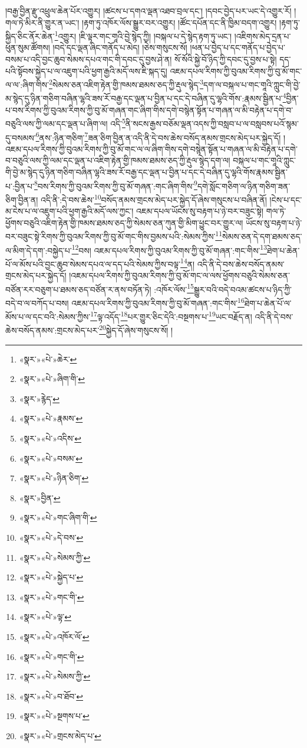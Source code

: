 །བརྒྱ་བྱིན་རྫུ་འཕྲུལ་ཆེན་པོར་འགྱུར། །ཚངས་པ་དགའ་ལྡན་འཐབ་བྲལ་དང་། །དབང་བྱེད་པར་ཡང་དེ་འགྱུར་རོ། །གལ་ཏེ་མིར་ནི་གྱུར་ན་ཡང་། །རྟག་ཏུ་འཁོར་ལོས་སྒྱུར་བར་འགྱུར། །ཚོང་དཔོན་དང་ནི་ཁྱིམ་བདག་འགྱུར། །རྟག་ཏུ་སྐྱིད་ཅིང་ནོར་ཆེན་\footnote{«སྣར་»«པེ་»ཆེར་}འགྱུར། །ཇི་ལྟར་གང་གཱའི་བྱེ་སྙེད་ཀྱི། །བསྐལ་པ་དེ་སྙེད་རྟག་ཏུ་ཡང་། །འཇིགས་མེད་དྲན་པ་ཕུན་སུམ་ཚོགས། །བདེ་དང་ལྡན་ཞིང་གནོད་པ་མེད། །ཅེས་གསུངས་སོ། །ཕན་པ་བྱེད་པ་དང་གནོད་པ་བྱེད་པ་བསམ་པ་འདི་བྱང་ཆུབ་སེམས་དཔའ་གང་གི་དབང་དུ་བྱས་ཤེ་ན། སོ་སོའི་སྐྱེ་བོ་ཉིད་ཀྱི་དབང་དུ་བྱས་པ་སྟེ། དད་པའི་སྟོབས་སྐྱེད་པ་ལ་འཇུག་པའི་ཕྱག་རྒྱའི་མདོ་ལས་ཇི་སྐད་དུ། འཇམ་དཔལ་རིགས་ཀྱི་བུའམ་རིགས་ཀྱི་བུ་མོ་གང་ལ་ལ་:ཞིག་གིས་\footnote{«སྣར་»«པེ་»ཞིག་གི་}སེམས་ཅན་འཇིག་རྟེན་གྱི་ཁམས་ཐམས་ཅད་ཀྱི་རྡུལ་སྙེད་\footnote{«སྣར་»རྙེད་}དག་ལ་བསྐལ་པ་གང་གཱའི་ཀླུང་གི་བྱེ་མ་སྙེད་དུ་ཉིན་གཅིག་བཞིན་ལྷའི་ཟས་རོ་བརྒྱ་དང་ལྡན་པ་བྱིན་པ་དང་དེ་བཞིན་དུ་ལྷའི་གོས་:རྣམས་སྦྱིན་པ་\footnote{«སྣར་»«པེ་»རྣམས་}བྱིན་པ་བས་རིགས་ཀྱི་བུའམ་རིགས་ཀྱི་བུ་མོ་གཞན་གང་ཞིག་གིས་དགེ་བསྙེན་སྟོན་པ་གཞན་ལ་མི་བརྟེན་པ་དགེ་བ་བཅུའི་ལས་ཀྱི་ལམ་དང་ལྡན་པ་ཞིག་ལ། འདི་\footnote{«སྣར་»«པེ་»འདིས་}ནི་སངས་རྒྱས་བཅོམ་ལྡན་འདས་ཀྱི་བསླབ་པ་ལ་བསླབས་པའོ་སྙམ་དུ་བསམས་\footnote{«སྣར་»«པེ་»བསམ་}ནས་:ཉིན་གཅིག་\footnote{«སྣར་»«པེ་»ཉིན་ཅིག་}ཟན་ཅིག་བྱིན་ན་འདི་ནི་དེ་བས་ཆེས་བསོད་ནམས་གྲངས་མེད་པར་སྐྱེད་དོ། །འཇམ་དཔལ་རིགས་ཀྱི་བུའམ་རིགས་ཀྱི་བུ་མོ་གང་ལ་ལ་ཞིག་གིས་དགེ་བསྙེན་སྟོན་པ་གཞན་ལ་མི་བརྟེན་པ་དགེ་བ་བཅུའི་ལས་ཀྱི་ལམ་དང་ལྡན་པ་འཇིག་རྟེན་གྱི་ཁམས་ཐམས་ཅད་ཀྱི་རྡུལ་སྙེད་དག་ལ། བསྐལ་པ་གང་གཱའི་ཀླུང་གི་བྱེ་མ་སྙེད་དུ་ཉིན་གཅིག་བཞིན་ལྷའི་ཟས་རོ་བརྒྱ་དང་ལྡན་པ་བྱིན་པ་དང་དེ་བཞིན་དུ་ལྷའི་གོས་རྣམས་སྦྱིན་པ་:བྱིན་པ་\footnote{«སྣར་»བྱིན་}བས་རིགས་ཀྱི་བུའམ་རིགས་ཀྱི་བུ་མོ་གཞན་:གང་ཞིག་གིས་\footnote{«སྣར་»«པེ་»གང་ཞིག་གི་}དགེ་སློང་གཅིག་ལ་ཉིན་གཅིག་ཟན་ཅིག་བྱིན་ན། འདི་ནི་:དེ་བས་ཆེས་\footnote{«སྣར་»«པེ་»དེ་བས་}བསོད་ནམས་གྲངས་མེད་པར་སྐྱེད་དོ་ཞེས་གསུངས་པ་བཞིན་ནོ། །ངེས་པ་དང་མ་ངེས་པ་ལ་འཇུག་པའི་ཕྱག་རྒྱའི་མདོ་ལས་ཀྱང་། འཇམ་དཔལ་ཡོངས་སུ་བརྟག་པ་ཉེ་བར་བཟུང་སྟེ། གལ་ཏེ་ཕྱོགས་བཅུའི་འཇིག་རྟེན་གྱི་ཁམས་ཐམས་ཅད་ཀྱི་སེམས་ཅན་ཀུན་གྱི་མིག་ཕྱུང་བར་གྱུར་ལ། ཡོངས་སུ་བརྟག་པ་ཉེ་བར་བཟུང་སྟེ་རིགས་ཀྱི་བུའམ་རིགས་ཀྱི་བུ་མོ་གང་གིས་བྱམས་པའི་:སེམས་ཀྱིས་\footnote{«སྣར་»«པེ་»སེམས་ཀྱི་}སེམས་ཅན་དེ་དག་ཐམས་ཅད་ལ་མིག་དེ་དག་:བསྐྱེད་པ་\footnote{«སྣར་»«པེ་»སྐྱེད་པ་}བས། འཇམ་དཔལ་རིགས་ཀྱི་བུའམ་རིགས་ཀྱི་བུ་མོ་གཞན་:གང་གིས་\footnote{«སྣར་»«པེ་»གང་གི་}ཐེག་པ་ཆེན་པོ་ལ་མོས་པའི་བྱང་ཆུབ་སེམས་དཔའ་ལ་དད་པའི་སེམས་ཀྱིས་བལྟ་\footnote{«སྣར་»«པེ་»ལྟ་}ན། འདི་ནི་དེ་བས་ཆེས་བསོད་ནམས་གྲངས་མེད་པར་སྐྱེད་དོ། །འཇམ་དཔལ་རིགས་ཀྱི་བུའམ་རིགས་ཀྱི་བུ་མོ་གང་ལ་ལས་ཕྱོགས་བཅུའི་སེམས་ཅན་བཙོན་རར་བཅུག་པ་ཐམས་ཅད་བཙོན་ར་ནས་བཏོན་ཏེ། :འཁོར་ལོས་\footnote{«སྣར་»«པེ་»འཁོར་ལོ་}སྒྱུར་བའི་བདེ་བའམ་ཚངས་པ་ཉིད་ཀྱི་བདེ་བ་ལ་བཀོད་པ་བས། འཇམ་དཔལ་རིགས་ཀྱི་བུའམ་རིགས་ཀྱི་བུ་མོ་གཞན་:གང་གིས་\footnote{«སྣར་»«པེ་»གང་གི་}ཐེག་པ་ཆེན་པོ་ལ་མོས་པ་ལ་དང་བའི་:སེམས་ཀྱིས་\footnote{«སྣར་»«པེ་»སེམས་ཀྱི་}ལྟ་འདོད་\footnote{«སྣར་»«པེ་»བ་ཐོབ་}པར་གྱུར་ཅིང་དེའི་:བསྔགས་པ་\footnote{«སྣར་»«པེ་»སྔགས་པ་}ཡང་བརྗོད་ན། འདི་ནི་དེ་བས་ཆེས་བསོད་ནམས་:གྲངས་མེད་པར་\footnote{«སྣར་»«པེ་»གྲངས་མེད་པ་}སྐྱེད་དོ་ཞེས་གསུངས་སོ། །
